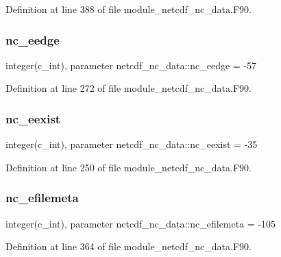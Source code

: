 Definition at line 388 of file module\+\_\+netcdf\+\_\+nc\+\_\+data.\+F90.

\mbox{\label{namespacenetcdf__nc__data_a17523983ee6366a4460590b0a0622c40}} 
\subsubsection{\texorpdfstring{nc\+\_\+eedge}{nc\_eedge}}
{\footnotesize\ttfamily integer(c\+\_\+int), parameter netcdf\+\_\+nc\+\_\+data\+::nc\+\_\+eedge = -\/57}



Definition at line 272 of file module\+\_\+netcdf\+\_\+nc\+\_\+data.\+F90.

\mbox{\label{namespacenetcdf__nc__data_ae45b7ca9441ed8700786c8b8642be8e5}} 
\subsubsection{\texorpdfstring{nc\+\_\+eexist}{nc\_eexist}}
{\footnotesize\ttfamily integer(c\+\_\+int), parameter netcdf\+\_\+nc\+\_\+data\+::nc\+\_\+eexist = -\/35}



Definition at line 250 of file module\+\_\+netcdf\+\_\+nc\+\_\+data.\+F90.

\mbox{\label{namespacenetcdf__nc__data_af93ef78d159c77b159bc56f000e51824}} 
\subsubsection{\texorpdfstring{nc\+\_\+efilemeta}{nc\_efilemeta}}
{\footnotesize\ttfamily integer(c\+\_\+int), parameter netcdf\+\_\+nc\+\_\+data\+::nc\+\_\+efilemeta = -\/105}



Definition at line 364 of file module\+\_\+netcdf\+\_\+nc\+\_\+data.\+F90.

